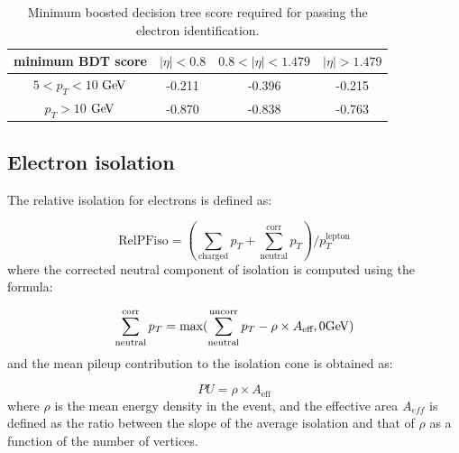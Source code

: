 \begin{table}[h!]
    \centering
    \begin{tabular}{c|c|c|c}
\hline %
minimum BDT score    &  $|\eta| < 0.8 $ & $0.8 < |\eta| < 1.479$ 	& $|\eta| > 1.479$      \\
\hline %
$ 5 < p_T < 10 $ $\mathrm{Ge\kern -0.1em V}$ &  -0.211      & -0.396  		& -0.215		\\
$p_T > 10$ $\mathrm{Ge\kern -0.1em V}$       &  -0.870		& -0.838		& -0.763		\\
\hline %
     \end{tabular}
    \caption{Minimum boosted decision tree score required for passing the electron identification.}
    \label{tab:ele_ID_WP}
\end{table}


\subsection{Electron isolation}
\label{sec:eleiso}

The relative isolation for electrons is defined as: 

\begin{equation}
\text{RelPFiso} = (\sum_{\text{charged}} p_T + \sum^{\text{corr}}_{\text{neutral}} p_T)/p_T^{\text{lepton}}  
\label{eqn:elepfrelisoeqn}
\end{equation} 
where the corrected neutral component of isolation is computed using the formula:

\begin{equation}
\label{eqn:neutralea}
  \sum^{\text{corr}}_{\text{neutral}} p_T = \text{max}(\sum^{\text{uncorr}}_{\text{neutral}} p_T - \rho \times A_\text{eff},0 \mathrm{Ge\kern -0.1em V})  
\end{equation}
and the mean pileup contribution to the isolation cone is obtained as:  

\begin{equation}
 PU =  \rho \times A_\text{eff}
\label{eqn:purho}
\end{equation}
where $\rho$ is the mean energy density in the event, and the effective area $A_{eff}$ is defined as the ratio
between the slope of the average isolation and that of $\rho$ as a function of the number of vertices. 

